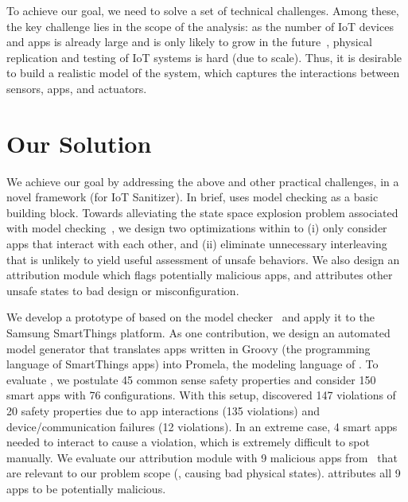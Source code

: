 To achieve our goal, we need to solve a set of technical challenges.
Among these, the key challenge lies in the scope of the analysis:
as the number of IoT devices and apps is already
large and is only likely to grow in the future~\cite{alpha,iotexp},
{\color{black} physical replication and testing of IoT systems is hard (due
to scale).} 
Thus, it is desirable to build a realistic model of the system,
which captures the interactions between sensors, apps, and actuators.

\section{Our Solution}
We achieve our goal by addressing the above and 
other practical challenges, in a novel framework \sys
(for IoT Sanitizer).
In brief, \sys uses model checking as a basic building block.
Towards alleviating the state space explosion problem associated with
model checking~\cite{Clarke2012},
we design two optimizations within \sys to
(i) only consider apps that interact with each other,
{\color{black}and (ii) eliminate unnecessary interleaving that is unlikely to yield useful assessment of unsafe behaviors.}
We also design an attribution module which flags potentially malicious apps,
and attributes other unsafe states to bad design or misconfiguration.

We develop a prototype of \sys based on the \spin model checker~\cite{Holzmann:spin}
and apply it to the Samsung SmartThings platform.
As one contribution, we design an automated model generator
that translates apps written in Groovy (the programming language of SmartThings apps)
into Promela, the modeling language of \spin.
{\color{black}To evaluate \sys,
we postulate 45 common sense safety properties} and consider 150 smart apps
with 76 configurations. With this setup,
\sys discovered 147 violations of 20 safety properties
due to app interactions (135 violations) and {\color{black}device/communication failures} (12 violations).
In an extreme case, 4 smart apps needed to interact to cause a violation,
which is extremely difficult to spot manually.
We evaluate our attribution module with 9 malicious apps
from~\cite{Jia:contexiot} that are relevant to our problem scope
(\eg, causing bad physical states).
\sys attributes all 9 apps to be potentially malicious.

